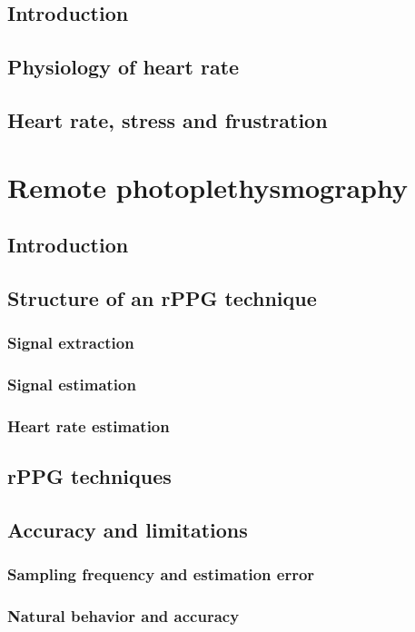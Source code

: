   \subsection{Introduction}
  \subsection{Physiology of heart rate}
  \subsection{Heart rate, stress and frustration}
\section{Remote photoplethysmography}
  \subsection{Introduction}
  \subsection{Structure of an rPPG technique}
    \subsubsection{Signal extraction}
    \subsubsection{Signal estimation}
    \subsubsection{Heart rate estimation}
  \subsection{rPPG techniques}
  \subsection{Accuracy and limitations}
    \subsubsection{Sampling frequency and estimation error}
    \subsubsection{Natural behavior and accuracy}
